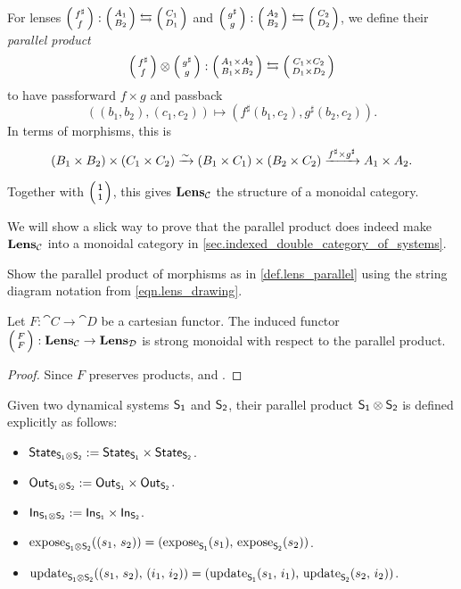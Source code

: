 \documentclass[DynamicalBook]{subfiles}
\begin{document}
\begin{definition}\label{def.lens_parallel}
  For lenses $\lens{f^{\sharp}}{f} : \lens{A_1}{B_2} \leftrightarrows \lens{C_1}{D_1}$ and
  $\lens{g^{\sharp}}{g} : \lens{A_2}{B_2} \leftrightarrows \lens{C_2}{D_2}$, we
  define their \emph{parallel product} $$\lens{f^{\sharp}}{f} \otimes
  \lens{g^{\sharp}}{g} : \lens{A_1 \times A_2}{B_1 \times B_2} \leftrightarrows
  \lens{C_1 \times C_2}{D_1 \times D_2}$$
  to have passforward $f \times g$ and passback
  $$((b_1, b_2), (c_1, c_2)) \mapsto (f^{\sharp}(b_1, c_2), g^{\sharp}(b_2, c_2)).$$
  In terms of morphisms, this is
  $$(B_1 \times B_2) \times (C_1 \times C_2) \xrightarrow{\sim} (B_1 \times C_1) \times
  (B_2 \times C_2) \xrightarrow{f^{\sharp} \times g^{\sharp}} A_1 \times A_2.$$

  Together with $\lens{\ord{1}}{\ord{1}}$, this gives $\textbf{Lens}_{\mathcal{C}}$ the
  structure of a monoidal category.
\end{definition}

\begin{remark}
  We will show a slick way to prove that the parallel product does indeed make
  $\textbf{Lens}_{\mathcal{C}}$ into a monoidal category in \cref{sec.indexed_double_category_of_systems}.
\end{remark}

\begin{exercise}
Show the parallel product of morphisms as in \cref{def.lens_parallel} using the string diagram notation from \eqref{eqn.lens_drawing}.
\end{exercise}


\begin{proposition}\label{prop.lens_functoriality_monoidal}
Let $F : \cat{C} \to \cat{D}$ be a cartesian functor. The induced functor
$\lens{F}{F} : \Cat{Lens}_{\cat{C}} \to \Cat{Lens}_{\cat{D}}$ is strong monoidal
with respect to the parallel product.
\end{proposition}
\begin{proof}
  Since $F$ preserves products, and .
\end{proof}

Given two dynamical systems $\mathsf{S_1}$ and $\mathsf{S_2}$, their parallel product
$\mathsf{S_1} \otimes \mathsf{S_2}$ is defined explicitly as follows:
\begin{itemize}
\item $\mathsf{State}_{\mathsf{S_1 \otimes S_2}} := \mathsf{State}_{\mathsf{S_1}} \times \mathsf{State}_{\mathsf{S_2}}$.
\item $\mathsf{Out}_{\mathsf{S_1 \otimes S_2}} := \mathsf{Out}_{\mathsf{S_1}} \times \mathsf{Out}_{\mathsf{S_2}}$.
\item $\mathsf{In}_{\mathsf{S_1 \otimes S_2}} := \mathsf{In}_{\mathsf{S_1}} \times \mathsf{In}_{\mathsf{S_2}}$.
\item $\mathrm{expose}_{\mathsf{S_1 \otimes S_2}}((s_1,\, s_2)) = (\mathrm{expose}_{\mathsf{S_1}}(s_1),\, \mathrm{expose}_{\mathsf{S_2}}(s_2))$.
\item $\mathrm{update}_{\mathsf{S_1 \otimes S_2}}((s_1,\, s_2),\, (i_1,\, i_2)) =
  (\mathrm{update}_{\mathsf{S_1}}(s_1,\, i_1),\, \mathrm{update}_{\mathsf{S_2}}(s_2,\, i_2))$.
\end{itemize}
\end{document}
